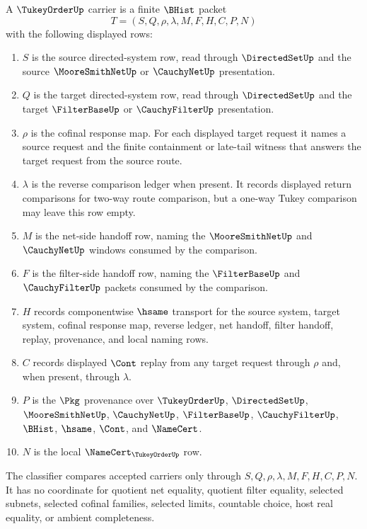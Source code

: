 \begin{definition}
\label{def:tukey-order-carrier}
A $\TukeyOrderUp$ carrier is a finite $\BHist$ packet
$$
T=(S,Q,\rho,\lambda,M,F,H,C,P,N)
$$
with the following displayed rows:
\begin{enumerate}
\item $S$ is the source directed-system row, read through $\DirectedSetUp$ and the source $\MooreSmithNetUp$ or $\CauchyNetUp$ presentation.
\item $Q$ is the target directed-system row, read through $\DirectedSetUp$ and the target $\FilterBaseUp$ or $\CauchyFilterUp$ presentation.
\item $\rho$ is the cofinal response map. For each displayed target request it names a source request and the finite containment or late-tail witness that answers the target request from the source route.
\item $\lambda$ is the reverse comparison ledger when present. It records displayed return comparisons for two-way route comparison, but a one-way Tukey comparison may leave this row empty.
\item $M$ is the net-side handoff row, naming the $\MooreSmithNetUp$ and $\CauchyNetUp$ windows consumed by the comparison.
\item $F$ is the filter-side handoff row, naming the $\FilterBaseUp$ and $\CauchyFilterUp$ packets consumed by the comparison.
\item $H$ records componentwise $\hsame$ transport for the source system, target system, cofinal response map, reverse ledger, net handoff, filter handoff, replay, provenance, and local naming rows.
\item $C$ records displayed $\Cont$ replay from any target request through $\rho$ and, when present, through $\lambda$.
\item $P$ is the $\Pkg$ provenance over $\TukeyOrderUp$, $\DirectedSetUp$, $\MooreSmithNetUp$, $\CauchyNetUp$, $\FilterBaseUp$, $\CauchyFilterUp$, $\BHist$, $\hsame$, $\Cont$, and $\NameCert$.
\item $N$ is the local $\NameCert_{\TukeyOrderUp}$ row.
\end{enumerate}
The classifier compares accepted carriers only through $S,Q,\rho,\lambda,M,F,H,C,P,N$. It has no coordinate for quotient net equality, quotient filter equality, selected subnets, selected cofinal families, selected limits, countable choice, host real equality, or ambient completeness.
\end{definition}

